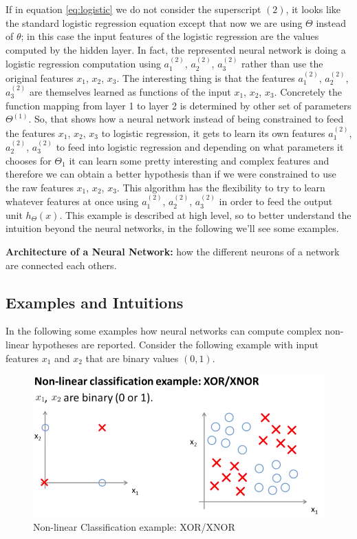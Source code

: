 If in equation \ref{eq:logistic} we do not consider the superscript $(2)$, it looks like the standard logistic regression equation except that now we are using $\Theta$ instead of $\theta$; in this case the input features of the logistic regression are the values computed by the hidden layer. In fact, the represented neural network is doing a logistic regression computation using $a_1^{(2)}$, $a_2^{(2)}$, $a_3^{(2)}$  rather than use the original features  $x_1$, $x_2$, $x_3$. The interesting thing is that the features $a_1^{(2)}$, $a_2^{(2)}$, $a_3^{(2)}$ are themselves learned as functions of the input $x_1$, $x_2$, $x_3$. Concretely the function mapping from layer 1 to layer 2 is determined by other set of parameters $\Theta^{(1)}$. So, that shows how a neural network instead of being constrained to feed the features $x_1$, $x_2$, $x_3$ to logistic regression, it gets to learn its own features $a_1^{(2)}$, $a_2^{(2)}$, $a_3^{(2)}$ to feed into logistic regression and depending on what parameters it chooses for $\Theta_1$ it can learn some pretty interesting and complex features and therefore we can obtain a better hypothesis than if we were constrained to use the raw features $x_1$, $x_2$, $x_3$. This algorithm has the flexibility to try to learn whatever features at once using $a_1^{(2)}$, $a_2^{(2)}$, $a_3^{(2)}$ in order to feed the output unit $h_\Theta(x)$. This example is described at high level, so to better understand the intuition beyond the neural networks, in the following we'll see some examples.


\begin{mydef}
{\bf Architecture of a Neural Network:} how the different neurons of a network are connected each others.
\end{mydef}



\subsection{Examples and Intuitions}

In the following some examples how neural networks can compute complex non-linear hypotheses are reported. Consider the following example with input features $x_1$ and $x_2$ that are binary values $(0,1)$.

\begin{figure}[H]
\begin{center}
\includegraphics[scale=0.25]{images/xor}
\end{center}
\caption{Non-linear Classification example: XOR/XNOR } 
\label{xor}
\end{figure}

